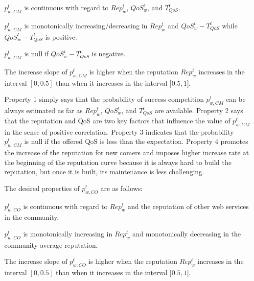 \documentclass[runningheads,a4paper]{llncs}
\begin{document}
\begin{property}
$p_{w,CM}^t$ is continuous with regard to $Rep^t_w$, $QoS_w^t$,
and $T_{QoS}^t$.
\end{property}
%
\begin{property}
$p_{w,CM}^t$  is monotonically increasing/decreasing in $Rep^t_w$
and $QoS_w^t - T_{QoS}^t$ while $QoS_w^t - T_{QoS}^t$ is positive.
\end{property}
%
\begin{property}
$p_{w,CM}^t$ is null if $QoS_w^t - T_{QoS}^t$ is negative.
\end{property}
%
%
\begin{property}
The increase slope of $p_{w,CM}^t$ is higher when the reputation
$Rep^t_w$ increases in the interval $[0, 0.5]$ than when it
increases in the interval $]0.5, 1]$.
\end{property}


\noindent Property 1 simply says that the probability of success
competition $p_{w,CM}^t$ can be always estimated as far as
$Rep^t_w$, $QoS_w^t$, and $T_{QoS}^t$ are available. Property 2
says that the reputation and QoS are two key factors that
influence the value of $p_{w,CM}^t$ in the sense of positive
correlation. Property 3 indicates that the probability
$p_{w,CM}^t$ is null if the offered QoS is less than the
expectation. Property 4 promotes the increase of the reputation
for new comers and imposes higher increase rate at the beginning
of the reputation curve because it is always hard to build the
reputation, but once it is built, its maintenance is less
challenging.


\noindent The desired properties of $p_{w,CO}^t$ are as follows:

\begin{property}
$p_{w,CO}^t$ is continuous with regard to $Rep^t_w$ and the
reputation of other web services in the community.
\end{property}
%
\begin{property}
$p_{w,CO}^t$  is monotonically increasing in $Rep^t_w$ and
 monotonically decreasing in the community average reputation.
\end{property}
%
%
%
\begin{property}
The increase slope of $p_{w,CO}^t$ is higher when the reputation
$Rep^t_w$ increases in the interval $[0, 0.5]$ than when it
increases in the interval $]0.5, 1]$.
\end{property}
\end{document}

